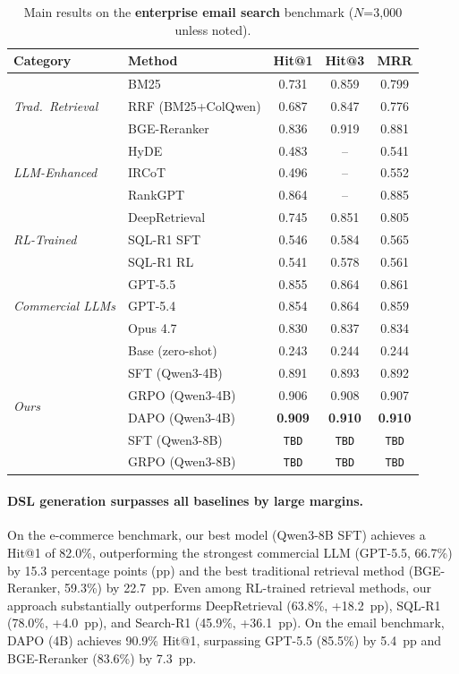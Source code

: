\documentclass[11pt]{article}
\begin{document}
\begin{table}[t]
\centering
\small
\caption{Main results on the \textbf{enterprise email search} benchmark ($N$=3{,}000 unless noted).}
\label{tab:main_email}
\begin{tabular}{llccc}
\toprule
\textbf{Category} & \textbf{Method} & \textbf{Hit@1} & \textbf{Hit@3} & \textbf{MRR} \\
\midrule
\multirow{3}{*}{\textit{Trad.\ Retrieval}}
& BM25 & 0.731 & 0.859 & 0.799 \\
& RRF (BM25+ColQwen) & 0.687 & 0.847 & 0.776 \\
& BGE-Reranker & 0.836 & 0.919 & 0.881 \\
\midrule
\multirow{3}{*}{\textit{LLM-Enhanced}}
& HyDE & 0.483 & -- & 0.541 \\
& IRCoT & 0.496 & -- & 0.552 \\
& RankGPT & 0.864 & -- & 0.885 \\
\midrule
\multirow{3}{*}{\textit{RL-Trained}}
& DeepRetrieval & 0.745 & 0.851 & 0.805 \\
& SQL-R1 SFT & 0.546 & 0.584 & 0.565 \\
& SQL-R1 RL & 0.541 & 0.578 & 0.561 \\
\midrule
\multirow{3}{*}{\textit{Commercial LLMs}}
& GPT-5.5 & 0.855 & 0.864 & 0.861 \\
& GPT-5.4 & 0.854 & 0.864 & 0.859 \\
& Opus 4.7 & 0.830 & 0.837 & 0.834 \\
\midrule
\multirow{6}{*}{\textit{Ours}}
& Base (zero-shot) & 0.243 & 0.244 & 0.244 \\
& SFT (Qwen3-4B) & 0.891 & 0.893 & 0.892 \\
& GRPO (Qwen3-4B) & 0.906 & 0.908 & 0.907 \\
& DAPO (Qwen3-4B) & \textbf{0.909} & \textbf{0.910} & \textbf{0.910} \\
& SFT (Qwen3-8B) & \texttt{TBD} & \texttt{TBD} & \texttt{TBD} \\
& GRPO (Qwen3-8B) & \texttt{TBD} & \texttt{TBD} & \texttt{TBD} \\
\bottomrule
\end{tabular}
\end{table}


\paragraph{DSL generation surpasses all baselines by large margins.}
On the e-commerce benchmark, our best model (Qwen3-8B SFT) achieves a Hit@1 of 82.0\%, outperforming the strongest commercial LLM (GPT-5.5, 66.7\%) by 15.3 percentage points (pp) and the best traditional retrieval method (BGE-Reranker, 59.3\%) by 22.7~pp. Even among RL-trained retrieval methods, our approach substantially outperforms DeepRetrieval (63.8\%, +18.2~pp), SQL-R1 (78.0\%, +4.0~pp), and Search-R1 (45.9\%, +36.1~pp). On the email benchmark, DAPO (4B) achieves 90.9\% Hit@1, surpassing GPT-5.5 (85.5\%) by 5.4~pp and BGE-Reranker (83.6\%) by 7.3~pp.
\end{document}
